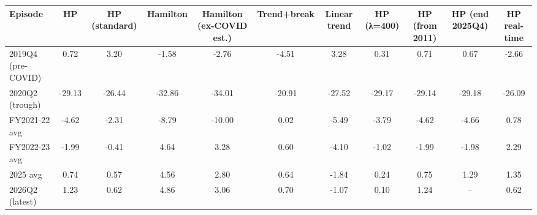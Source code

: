 \begin{tabular}{lcccccccccc}
\toprule
Episode & HP & HP (standard) & Hamilton & Hamilton (ex-COVID est.) & Trend+break & Linear trend & HP (λ=400) & HP (from 2011) & HP (end 2025Q4) & HP real-time \\
\midrule
2019Q4 (pre-COVID) & 0.72 & 3.20 & -1.58 & -2.76 & -4.51 & 3.28 & 0.31 & 0.71 & 0.67 & -2.66 \\
2020Q2 (trough) & -29.13 & -26.44 & -32.86 & -34.01 & -20.91 & -27.52 & -29.17 & -29.14 & -29.18 & -26.09 \\
FY2021-22 avg & -4.62 & -2.31 & -8.79 & -10.00 & 0.02 & -5.49 & -3.79 & -4.62 & -4.66 & 0.78 \\
FY2022-23 avg & -1.99 & -0.41 & 4.64 & 3.28 & 0.60 & -4.10 & -1.02 & -1.99 & -1.98 & 2.29 \\
2025 avg & 0.74 & 0.57 & 4.56 & 2.80 & 0.64 & -1.84 & 0.24 & 0.75 & 1.29 & 1.35 \\
2026Q2 (latest) & 1.23 & 0.62 & 4.86 & 3.06 & 0.70 & -1.07 & 0.10 & 1.24 & – & 0.62 \\
\bottomrule
\end{tabular}
